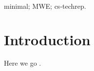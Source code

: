 \documentclass[conference,a4paper,flushend]{cs-techrep} %
\begin{document}
\selectlanguage{\cstechrepLang}
\maketitle
\begin{abstract}
This paper is a minimal working example.
\end{abstract}
\begin{IEEEkeywords}
minimal; MWE; cs-techrep.
\end{IEEEkeywords}

\section{Introduction}
Here we go \cite{article-full}.

\sloppy
\printbibliography[notcategory=selfref]
\end{document}
